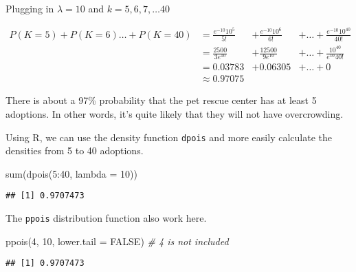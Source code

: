 \documentclass[
]{article}
\newenvironment{Shaded}{\begin{snugshade}}{\end{snugshade}}
\newcommand{\AttributeTok}[1]{\textcolor[rgb]{0.77,0.63,0.00}{#1}}
\newcommand{\CommentTok}[1]{\textcolor[rgb]{0.56,0.35,0.01}{\textit{#1}}}
\newcommand{\ConstantTok}[1]{\textcolor[rgb]{0.00,0.00,0.00}{#1}}
\newcommand{\DecValTok}[1]{\textcolor[rgb]{0.00,0.00,0.81}{#1}}
\newcommand{\FunctionTok}[1]{\textcolor[rgb]{0.00,0.00,0.00}{#1}}
\newcommand{\NormalTok}[1]{#1}
\newcommand{\SpecialCharTok}[1]{\textcolor[rgb]{0.00,0.00,0.00}{#1}}
\begin{document}
Plugging in \(\lambda = 10\) and \(k=5,6,7,\ldots40\)

\[ \begin{split}
P(K=5) + P(K=6) \ldots + P(K=40) &= \frac{e^{-10}10^5}{5!} &+ \frac{e^{-10}10^6}{6!} &+ \ldots + \frac{e^{-10}10^{40}}{40!} \\ &=\frac{2500}{3e^{10}} &+ \frac{12500}{9e^{10}} &+ \ldots + \frac{10^{40}}{e^{10}40!} \\ &= 0.03783 &+ 0.06305 &+ \ldots +0 \\ &\approx 0.97075 \end{split}\]

There is about a 97\% probability that the pet rescue center has at least 5 adoptions. In other words, it's quite likely that they will not have overcrowding.

Using R, we can use the density function \texttt{dpois} and more easily calculate the densities from 5 to 40 adoptions.

\begin{Shaded}
\begin{Highlighting}[]
\FunctionTok{sum}\NormalTok{(}\FunctionTok{dpois}\NormalTok{(}\DecValTok{5}\SpecialCharTok{:}\DecValTok{40}\NormalTok{, }\AttributeTok{lambda =} \DecValTok{10}\NormalTok{))}
\end{Highlighting}
\end{Shaded}

\begin{verbatim}
## [1] 0.9707473
\end{verbatim}

The \texttt{ppois} distribution function also work here.

\begin{Shaded}
\begin{Highlighting}[]
\FunctionTok{ppois}\NormalTok{(}\DecValTok{4}\NormalTok{, }\DecValTok{10}\NormalTok{, }\AttributeTok{lower.tail =} \ConstantTok{FALSE}\NormalTok{) }\CommentTok{\# 4 is not included}
\end{Highlighting}
\end{Shaded}

\begin{verbatim}
## [1] 0.9707473
\end{verbatim}
\end{document}
